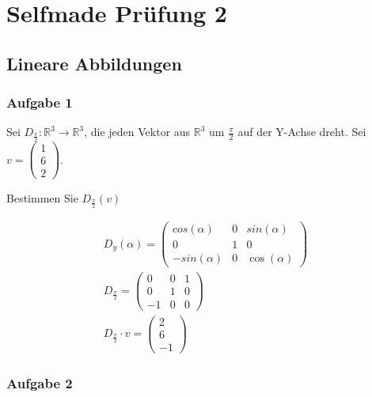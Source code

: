 \chapter{Selfmade Prüfung 2}

\section{Lineare Abbildungen}

\subsection{Aufgabe 1}

Sei $D_{\frac{\pi}{2}}: \mathbb{R}^3 \rightarrow \mathbb{R}^3$, die jeden
Vektor aus $\mathbb{R}^3$ um $\frac{\pi}{2}$ auf der Y-Achse dreht. Sei $v = \begin{pmatrix}
        1 \\ 6 \\ 2
    \end{pmatrix}$.

Bestimmen Sie $D_{\frac{\pi}{2}}(v)$

\begin{align*}
    D_y(\alpha) = \begin{pmatrix}
                      cos(\alpha)  & 0 & sin(\alpha)  \\
                      0            & 1 & 0            \\
                      -sin(\alpha) & 0 & \cos(\alpha)
                  \end{pmatrix} \\
    D_{\frac{\pi}{2}} = \begin{pmatrix}
                            0  & 0 & 1 \\
                            0  & 1 & 0 \\
                            -1 & 0 & 0
                        \end{pmatrix}            \\
    D_{\frac{\pi}{2}} \cdot v = \begin{pmatrix}
                                    2 \\ 6 \\ -1
                                \end{pmatrix}
\end{align*}

\subsection{Aufgabe 2}

